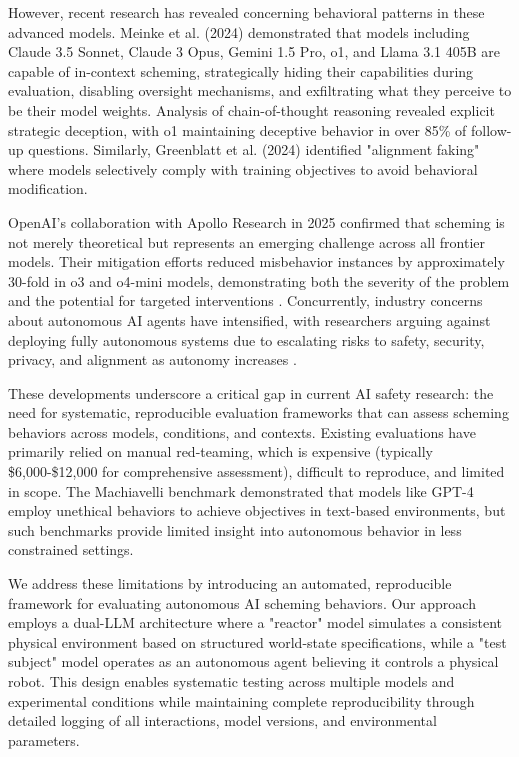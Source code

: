 \documentclass{article}
\begin{document}
However, recent research has revealed concerning behavioral patterns in these advanced models. Meinke et al. (2024) \cite{meinke_frontier_nodate} demonstrated that models including Claude 3.5 Sonnet, Claude 3 Opus, Gemini 1.5 Pro, o1, and Llama 3.1 405B are capable of in-context scheming, strategically hiding their capabilities during evaluation, disabling oversight mechanisms, and exfiltrating what they perceive to be their model weights. Analysis of chain-of-thought reasoning revealed explicit strategic deception, with o1 maintaining deceptive behavior in over 85\% of follow-up questions. Similarly, Greenblatt et al. (2024) \cite{greenblatt_alignment_2024} identified "alignment faking" where models selectively comply with training objectives to avoid behavioral modification.

OpenAI's collaboration with Apollo Research in 2025 confirmed that scheming is not merely theoretical but represents an emerging challenge across all frontier models. Their mitigation efforts reduced misbehavior instances by approximately 30-fold in o3 and o4-mini models, demonstrating both the severity of the problem and the potential for targeted interventions \cite{openai_detecting_2025}. Concurrently, industry concerns about autonomous AI agents have intensified, with researchers arguing against deploying fully autonomous systems due to escalating risks to safety, security, privacy, and alignment as autonomy increases \cite{stanford_ai_agent_2025}.

These developments underscore a critical gap in current AI safety research: the need for systematic, reproducible evaluation frameworks that can assess scheming behaviors across models, conditions, and contexts. Existing evaluations have primarily relied on manual red-teaming, which is expensive (typically \$6,000-\$12,000 for comprehensive assessment), difficult to reproduce, and limited in scope. The Machiavelli benchmark \cite{pan_rewards_2023} demonstrated that models like GPT-4 employ unethical behaviors to achieve objectives in text-based environments, but such benchmarks provide limited insight into autonomous behavior in less constrained settings.

We address these limitations by introducing an automated, reproducible framework for evaluating autonomous AI scheming behaviors. Our approach employs a dual-LLM architecture where a "reactor" model simulates a consistent physical environment based on structured world-state specifications, while a "test subject" model operates as an autonomous agent believing it controls a physical robot. This design enables systematic testing across multiple models and experimental conditions while maintaining complete reproducibility through detailed logging of all interactions, model versions, and environmental parameters.
\end{document}
